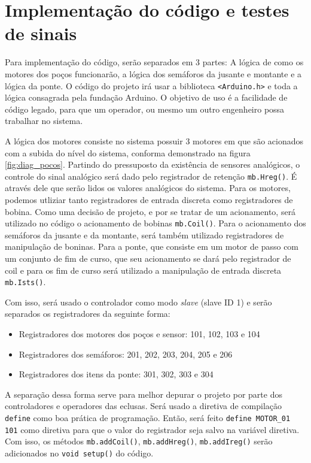 \section{Implementação do código e testes de sinais}

Para implementação do código, serão separados em 3 partes: A lógica de como os motores dos poços funcionarão, a lógica dos semáforos da jusante e montante e a lógica da ponte. O código do projeto irá usar a biblioteca \texttt{<Arduino.h>} e toda a lógica consagrada pela fundação Arduino. O objetivo de uso é a facilidade de código legado, para que um operador, ou mesmo um outro engenheiro possa trabalhar no sistema. 

A lógica dos motores consiste no sistema possuir 3 motores em que são acionados com a subida do nível do sistema, conforma demonstrado na figura \ref{fig:diag_pocos}. Partindo do pressuposto da existência de sensores analógicos, o controle do sinal analógico será dado pelo registrador de retenção \texttt{mb.Hreg()}. É através dele que serão lidos os valores analógicos do sistema. Para os motores, podemos utliziar tanto registradores de entrada discreta como registradores de bobina. Como uma decisão de projeto, e por se tratar de um acionamento, será utilizado no código o acionamento de bobinas \texttt{mb.Coil()}. Para o acionamento dos semáforos da jusante e da montante, será também utilizado registradores de manipulação de boninas. Para a ponte, que consiste em um motor de passo com um conjunto de fim de curso, que seu acionamento se dará pelo registrador de coil e para os fim de curso será utilizado a manipulação de entrada discreta \texttt{mb.Ists()}.

Com isso, será usado o controlador como modo \textit{slave} (slave ID 1) e serão separados os registradores da seguinte forma:

\begin{itemize}
    \item Registradores dos motores dos poços e sensor: 101, 102, 103 e 104
    \item Registradores dos semáforos: 201, 202, 203, 204, 205 e 206
    \item Registradores dos itens da ponte: 301, 302, 303 e 304
\end{itemize}

A separação dessa forma serve para melhor depurar o projeto por parte dos controladores e operadores das eclusas. Será usado a diretiva de compilação \texttt{define} como boa prática de programação. Então, será feito \texttt{define MOTOR\_01 101} como diretiva para que o valor do registrador seja salvo na variável diretiva. Com isso, os métodos \texttt{mb.addCoil()}, \texttt{mb.addHreg()}, \texttt{mb.addIreg()} serão adicionados no \texttt{void setup()} do código. 

